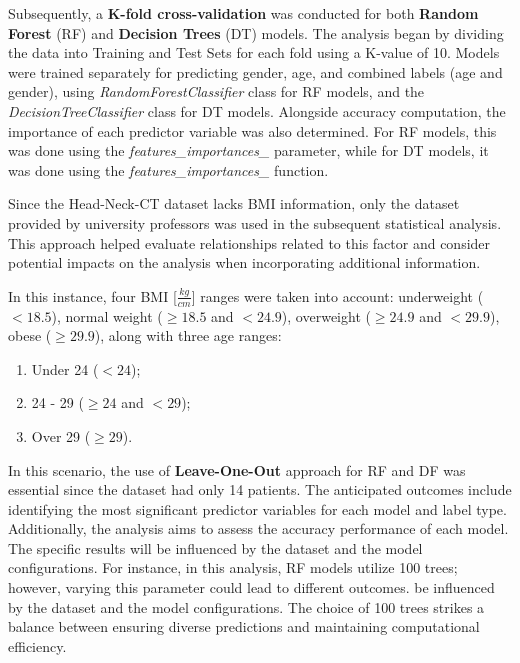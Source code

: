 \documentclass[journal,article,submit,pdftex,moreauthors]{Definitions/mdpi}
\begin{document}
Subsequently, a \textbf{K-fold cross-validation} was conducted for both \textbf{Random Forest} (RF) and \textbf{Decision Trees} (DT) models. The analysis began by dividing the data into Training and Test Sets for each fold using a K-value of 10. Models were trained separately for predicting gender, age, and combined labels (age and gender), using \textit{RandomForestClassifier} class for RF models, and the \textit{DecisionTreeClassifier} class for DT models. Alongside accuracy computation, the importance of each predictor variable was also determined. For RF models, this was done using the \textit{features\_importances\_} parameter, while for DT models, it was done using the \textit{features\_importances\_} function.

Since the Head-Neck-CT dataset lacks BMI information, only the dataset provided by university professors was used in the subsequent statistical analysis. This approach helped evaluate relationships related to this factor and consider potential impacts on the analysis when incorporating additional information.


\newpage
\noindent In this instance, four BMI [$\frac{kg}{cm}$] ranges were taken into account: underweight ($< 18.5$), normal weight ($\geq 18.5$ and $< 24.9$), overweight ($\geq 24.9$ and $< 29.9$), obese ($\geq 29.9$), along with three age ranges:
\begin{enumerate}
    \item Under 24 ($< 24$);
    \item 24 - 29 ($\geq 24$ and $< 29$);
    \item Over 29 ($\geq 29$).
\end{enumerate}
In this scenario, the use of \textbf{Leave-One-Out} approach for RF and DF was essential since the dataset had only 14 patients. The anticipated outcomes include identifying the most significant predictor variables for each model and label type. Additionally, the analysis aims to assess the accuracy performance of each model. The specific results will be influenced by the dataset and the model configurations. For instance, 
in this analysis, RF models utilize 100 trees; however, varying this parameter could lead to different outcomes. be influenced by the dataset and the model configurations. The choice of 100 trees strikes a balance between ensuring diverse predictions and maintaining computational efficiency.
\end{document}
